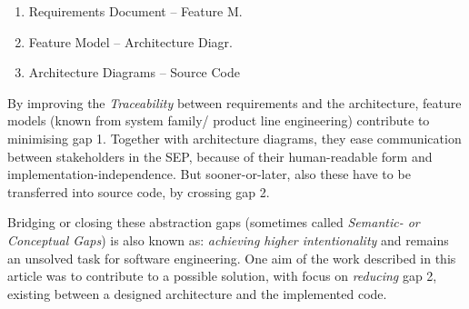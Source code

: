 \begin{enumerate}
    \item[1a] Requirements Document -- Feature M.
    \item[1b] Feature Model -- Architecture Diagr.
    \item[2] Architecture Diagrams -- Source Code
\end{enumerate}

By improving the \emph{Traceability} between requirements and the architecture,
feature models (known from system family/ product line engineering) contribute
to minimising gap 1. Together with architecture diagrams, they ease
communication between stakeholders in the SEP, because of their human-readable
form and implementation-independence. But sooner-or-later, also these have to
be transferred into source code, by crossing gap 2.

Bridging or closing these abstraction gaps (sometimes called \emph{Semantic- or
Conceptual Gaps}) is also known as: \textit{achieving higher intentionality}
and remains an unsolved task for software engineering. One aim of the work
described in this article was to contribute to a possible solution, with focus
on \emph{reducing} gap 2, existing between a designed architecture and the
implemented code.
